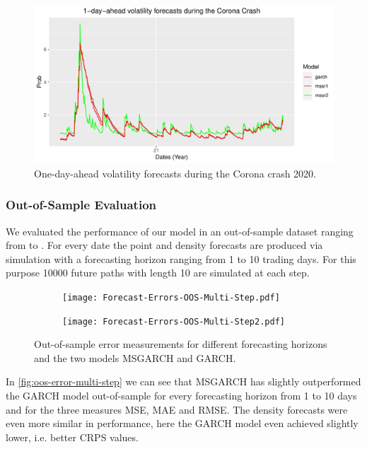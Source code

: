 \documentclass[11pt,a4paper]{article}
\begin{document}
\begin{figure}[H]
	\label{img:single-state-forecasts}
	\includegraphics[width=\linewidth]{CoronaCrash_MSGARCH_Decomposition.pdf}
	\caption{One-day-ahead volatility forecasts during the Corona crash 2020. }
\end{figure}


\subsubsection{Out-of-Sample Evaluation}
We evaluated the performance of our model in an out-of-sample dataset ranging from  to . For every date the point and density forecasts are produced via simulation with a forecasting horizon ranging from 1 to 10 trading days. For this purpose 10000 future paths with length 10 are simulated at each step.

\begin{figure}[H]
	\label{fig:oos-error-multi-step}
	\begin{subfigure}{1.2\textwidth}
	\centering
	\texttt{[image: Forecast-Errors-OOS-Multi-Step.pdf]}
	\end{subfigure}

	\begin{subfigure}{1.2\textwidth}
	\centering
	\texttt{[image: Forecast-Errors-OOS-Multi-Step2.pdf]}
	\end{subfigure}
	\caption{Out-of-sample error measurements for different forecasting horizons and the two models MSGARCH and GARCH.}
\end{figure}


In \cref{fig:oos-error-multi-step} we can see that MSGARCH has slightly outperformed the GARCH model out-of-sample for every forecasting horizon from 1 to 10 days and for the three measures \ac{MSE}, \ac{MAE} and \ac{RMSE}. The density forecasts were even more similar in performance, here the GARCH model even  achieved slightly lower, i.e. better \ac{CRPS} values.
\end{document}
